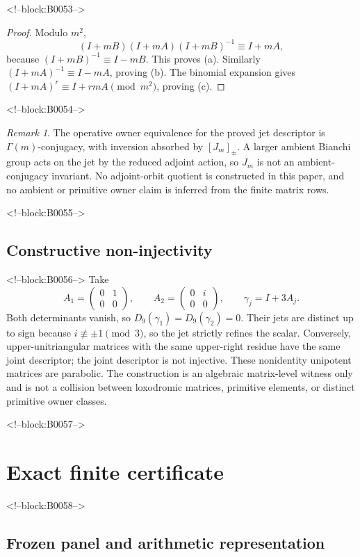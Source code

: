 \documentclass[11pt,a4paper]{article}
\theoremstyle{definition}
\theoremstyle{remark}
\newtheorem{remark}[theorem]{Remark}
\begin{document}
<!--block:B0053-->
\begin{proof}
Modulo \(m^2\),
\[
 (I+mB)(I+mA)(I+mB)^{-1}\equiv I+mA,
\]
because \((I+mB)^{-1}\equiv I-mB\). This proves (a). Similarly \((I+mA)^{-1}\equiv I-mA\), proving (b). The binomial expansion gives \((I+mA)^r\equiv I+rmA\pmod{m^2}\), proving (c).
\end{proof}

<!--block:B0054-->
\begin{remark}
The operative owner equivalence for the proved jet descriptor is \(\Gamma(m)\)-conjugacy, with inversion absorbed by \([J_m]_{\pm}\). A larger ambient Bianchi group acts on the jet by the reduced adjoint action, so \(J_m\) is not an ambient-conjugacy invariant. No adjoint-orbit quotient is constructed in this paper, and no ambient or primitive owner claim is inferred from the finite matrix rows.
\end{remark}

<!--block:B0055-->
\subsection{Constructive non-injectivity}

<!--block:B0056-->
Take
\[
 A_1=\begin{pmatrix}0&1\\0&0\end{pmatrix},\qquad
 A_2=\begin{pmatrix}0&i\\0&0\end{pmatrix},\qquad
 \gamma_j=I+3A_j.
\]
Both determinants vanish, so \(D_9(\gamma_1)=D_9(\gamma_2)=0\). Their jets are distinct up to sign because \(i\not\equiv\pm1\pmod3\), so the jet strictly refines the scalar. Conversely, upper-unitriangular matrices with the same upper-right residue have the same joint descriptor; the joint descriptor is not injective. These nonidentity unipotent matrices are parabolic. The construction is an algebraic matrix-level witness only and is not a collision between loxodromic matrices, primitive elements, or distinct primitive owner classes.

<!--block:B0057-->
\section{Exact finite certificate}

<!--block:B0058-->
\subsection{Frozen panel and arithmetic representation}
\end{document}
